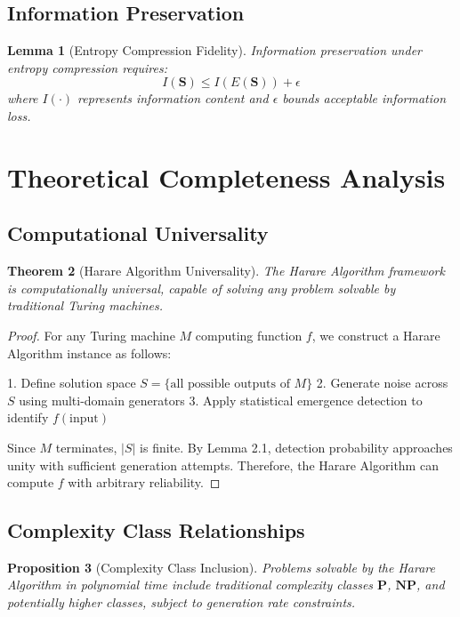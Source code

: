 \documentclass[11pt,a4paper]{article}
\newtheorem{theorem}{Theorem}[section]
\newtheorem{lemma}[theorem]{Lemma}
\newtheorem{proposition}[theorem]{Proposition}
\theoremstyle{remark}
\begin{document}
\subsection{Information Preservation}

\begin{lemma}[Entropy Compression Fidelity]
Information preservation under entropy compression requires:
$$I(\mathbf{S}) \leq I(E(\mathbf{S})) + \epsilon$$
where $I(\cdot)$ represents information content and $\epsilon$ bounds acceptable information loss.
\end{lemma}

\section{Theoretical Completeness Analysis}

\subsection{Computational Universality}

\begin{theorem}[Harare Algorithm Universality]
The Harare Algorithm framework is computationally universal, capable of solving any problem solvable by traditional Turing machines.
\end{theorem}

\begin{proof}
For any Turing machine $M$ computing function $f$, we construct a Harare Algorithm instance as follows:

1. Define solution space $S = \{\text{all possible outputs of } M\}$
2. Generate noise across $S$ using multi-domain generators
3. Apply statistical emergence detection to identify $f(\text{input})$

Since $M$ terminates, $|S|$ is finite. By Lemma 2.1, detection probability approaches unity with sufficient generation attempts. Therefore, the Harare Algorithm can compute $f$ with arbitrary reliability.
\end{proof}

\subsection{Complexity Class Relationships}

\begin{proposition}[Complexity Class Inclusion]
Problems solvable by the Harare Algorithm in polynomial time include traditional complexity classes $\mathbf{P}$, $\mathbf{NP}$, and potentially higher classes, subject to generation rate constraints.
\end{proposition}
\end{document}
